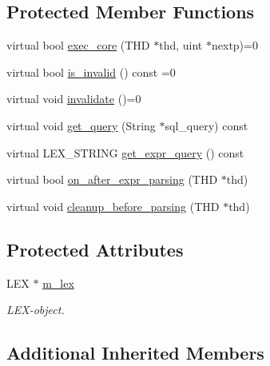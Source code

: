 \subsection*{Protected Member Functions}
\begin{DoxyCompactItemize}
\item 
virtual bool \mbox{\hyperlink{classsp__lex__instr_acab4e56f638f43101c11f838e1f9d395}{exec\+\_\+core}} (T\+HD $\ast$thd, uint $\ast$nextp)=0
\item 
virtual bool \mbox{\hyperlink{classsp__lex__instr_a56788cb475ccf94f224816006d9c90e9}{is\+\_\+invalid}} () const =0
\item 
virtual void \mbox{\hyperlink{classsp__lex__instr_ae9945d69ab5d91d6ce215f194beea882}{invalidate}} ()=0
\item 
virtual void \mbox{\hyperlink{classsp__lex__instr_a8bbcccae8739634565f8be2134171b03}{get\+\_\+query}} (String $\ast$sql\+\_\+query) const
\item 
virtual L\+E\+X\+\_\+\+S\+T\+R\+I\+NG \mbox{\hyperlink{classsp__lex__instr_ad355d3ed08ae1fef4811fe6838ed78e2}{get\+\_\+expr\+\_\+query}} () const
\item 
virtual bool \mbox{\hyperlink{classsp__lex__instr_adcace7d5b7daeb393d0592592a2d9d6c}{on\+\_\+after\+\_\+expr\+\_\+parsing}} (T\+HD $\ast$thd)
\item 
virtual void \mbox{\hyperlink{classsp__lex__instr_aea0d857d412f89095bde90fa083e8c24}{cleanup\+\_\+before\+\_\+parsing}} (T\+HD $\ast$thd)
\end{DoxyCompactItemize}
\subsection*{Protected Attributes}
\begin{DoxyCompactItemize}
\item 
\mbox{\label{classsp__lex__instr_a8a4ca70d2aa8695a5a056b840b7aae49}} 
L\+EX $\ast$ \mbox{\hyperlink{classsp__lex__instr_a8a4ca70d2aa8695a5a056b840b7aae49}{m\+\_\+lex}}
\begin{DoxyCompactList}\small\item\em L\+EX-\/object. \end{DoxyCompactList}\end{DoxyCompactItemize}
\subsection*{Additional Inherited Members}


